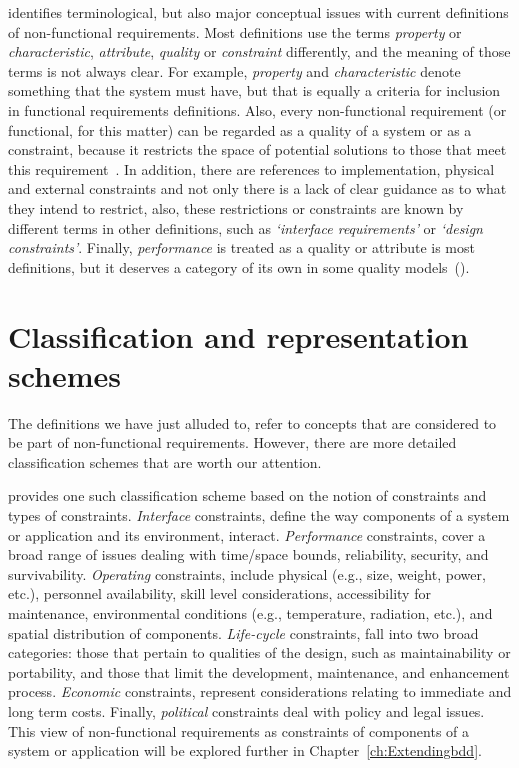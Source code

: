 \documentclass[dissertation,final]{softeng}
\begin{document}
{\citet{Glinz:2007ehba} identifies terminological, but also major conceptual issues with current definitions of non-functional requirements. Most definitions use the terms \emph{property} or \emph{characteristic}, \emph{attribute}, \emph{quality} or \emph{constraint} differently, and the meaning of those terms is not always clear. For example, \emph{property} and \emph{characteristic} denote something that the system must have, but that is equally a criteria for inclusion in functional requirements definitions. Also, every non-functional requirement (or functional, for this matter) can be regarded as a quality of a system or as a constraint, because it restricts the space of potential solutions to those that meet this requirement~\citep{Glinz:2007ehba}. In addition, there are references to implementation, physical and external constraints and not only there is a lack of clear guidance as to what they intend to restrict, also, these restrictions or constraints are known by different terms in other definitions, such as \emph{`interface requirements'} or \emph{`design constraints'}. Finally, \emph{performance} is treated as a quality or attribute is most definitions, but it deserves a category of its own in some quality models~().

\section{Classification and representation schemes}

The definitions we have just alluded to, refer to concepts that are considered to be part of non-functional requirements. However, there are more detailed classification schemes that are worth our attention.

\citet{Roman:1985} provides one such classification scheme based on the notion of constraints and types of constraints. \emph{Interface} constraints, define the way components of a system or application and its environment, interact. \emph{Performance} constraints, cover a broad range of issues dealing with time/space bounds, reliability, security, and survivability. \emph{Operating} constraints, include physical (e.g., size, weight, power, etc.), personnel availability, skill level considerations, accessibility for maintenance, environmental conditions (e.g., temperature, radiation, etc.), and spatial distribution of components. \emph{Life-cycle} constraints, fall into two broad categories: those that pertain to qualities of the design, such as maintainability or portability, and those that limit the development, maintenance, and enhancement process. \emph{Economic} constraints, represent considerations relating to immediate and long term costs. Finally, \emph{political} constraints deal with policy and legal issues. This view of non-functional requirements as constraints of components of a system or application will be explored further in Chapter~\ref{ch:Extendingbdd}.

}
\end{document}
